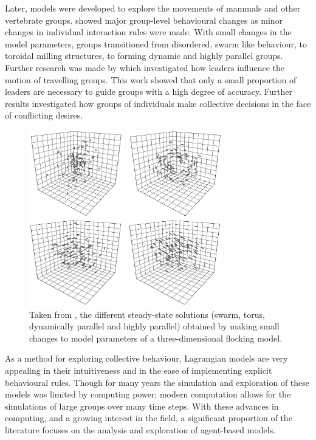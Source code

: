 Later, models were developed to explore the movements of mammals and other vertebrate groups. \citet{couzin02} showed major group-level behavioural changes as minor changes in individual interaction rules were made. With small changes in the model parameters, groups transitioned from disordered, swarm like behaviour, to toroidal milling structures, to forming dynamic and highly parallel groups. Further research was made by \citet{couzin05} which investigated how leaders influence the motion of travelling groups. This work showed that only a small proportion of leaders are necessary to guide groups with a high degree of accuracy. Further results investigated how groups of individuals make collective decisions in the face of conflicting desires.

\begin{figure}[!htbp]
	\includegraphics[width=0.75\textwidth]{fig/couzin.png}
	\caption{Taken from \citet{couzin02}, the different steady-state solutions (swarm, torus, dynamically parallel and highly parallel) obtained by making small changes to model parameters of a three-dimensional flocking model.}
	\label{fig:couzin}
\end{figure}

As a method for exploring collective behaviour, Lagrangian models are very appealing in their intuitiveness and in the ease of implementing explicit behavioural rules. Though for many years the simulation and exploration of these models was limited by computing power; modern computation allows for the simulations of large groups over many time steps. With these advances in computing, and a growing interest in the field, a significant proportion of the literature focuses on the analysis and exploration of agent-based models.

